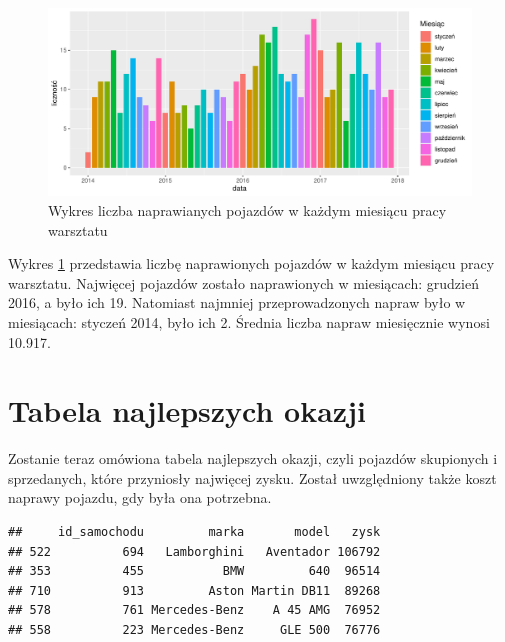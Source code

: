\documentclass{article}\usepackage[]{graphicx}\usepackage[]{xcolor}
\makeatletter
\def\maxwidth{ %
  \ifdim\Gin@nat@width>\linewidth
    \linewidth
  \else
    \Gin@nat@width
  \fi
}
\newenvironment{kframe}{%
 \def\at@end@of@kframe{}%
 \ifinner\ifhmode%
  \def\at@end@of@kframe{\end{minipage}}%
  \begin{minipage}{\columnwidth}%
 \fi\fi%
 \def\FrameCommand##1{\hskip\@totalleftmargin \hskip-\fboxsep
 \colorbox{shadecolor}{##1}\hskip-\fboxsep
     \hskip-\linewidth \hskip-\@totalleftmargin \hskip\columnwidth}%
 \MakeFramed {\advance\hsize-\width
   \@totalleftmargin\z@ \linewidth\hsize
   \@setminipage}}%
 {\par\unskip\endMakeFramed%
 \at@end@of@kframe}
\newenvironment{knitrout}{}{} %
\makeatother
\begin{document}
\begin{knitrout}
\color{fgcolor}\begin{figure}[H]

{\centering \includegraphics[width=\maxwidth]{figure/fig_naprawy_miesiecznie-1} 

}

\caption[Wykres liczba naprawianych pojazdów w każdym miesiącu pracy warsztatu]{Wykres liczba naprawianych pojazdów w każdym miesiącu pracy warsztatu}\label{fig:fig_naprawy_miesiecznie}
\end{figure}

\end{knitrout}

Wykres \ref{fig:fig_naprawy_miesiecznie} przedstawia liczbę naprawionych pojazdów w każdym miesiącu pracy warsztatu. Najwięcej pojazdów zostało naprawionych w miesiącach: 
grudzień 2016,
a było ich 19. Natomiast najmniej przeprowadzonych napraw było w miesiącach:
styczeń 2014,
było ich 2. Średnia liczba napraw miesięcznie wynosi 
10.917. 

\section{Tabela najlepszych okazji}

Zostanie teraz omówiona tabela najlepszych okazji, czyli pojazdów skupionych i sprzedanych, które przyniosły najwięcej zysku. Został uwzględniony także koszt naprawy pojazdu, gdy była ona potrzebna.





\begin{knitrout}
\color{fgcolor}\begin{kframe}
\begin{verbatim}
##     id_samochodu         marka       model   zysk
## 522          694   Lamborghini   Aventador 106792
## 353          455           BMW         640  96514
## 710          913         Aston Martin DB11  89268
## 578          761 Mercedes-Benz    A 45 AMG  76952
## 558          223 Mercedes-Benz     GLE 500  76776
\end{verbatim}
\end{kframe}
\end{knitrout}
\end{document}
